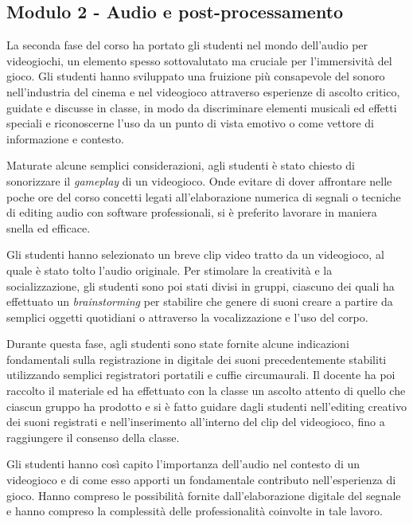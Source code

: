 \documentclass{easychair}
\begin{document}
\subsection{Modulo 2 - Audio e post-processamento}

La seconda fase del corso ha portato gli studenti nel mondo dell'audio per videogiochi, un elemento spesso sottovalutato ma cruciale per l'immersività del gioco. Gli studenti hanno sviluppato una fruizione più consapevole del sonoro nell'industria del cinema e nel videogioco attraverso esperienze di ascolto critico, guidate e discusse in classe, in modo da discriminare elementi musicali ed effetti speciali e riconoscerne l'uso da un punto di vista emotivo o come vettore di informazione e contesto.

Maturate alcune semplici considerazioni, agli studenti è stato chiesto di sonorizzare il \textit{gameplay} di un videogioco. Onde evitare di dover affrontare nelle poche ore del corso concetti legati all'elaborazione numerica di segnali o tecniche di editing audio con software professionali, si è preferito lavorare in maniera snella ed efficace. 

Gli studenti hanno selezionato un breve clip video tratto da un videogioco, al quale è stato tolto l'audio originale. Per stimolare la creatività e la socializzazione, gli studenti sono poi stati divisi in gruppi, ciascuno dei quali ha effettuato un \textit{brainstorming} per stabilire che genere di suoni creare a partire da semplici oggetti quotidiani o attraverso la vocalizzazione e l'uso del corpo.

Durante questa fase, agli studenti sono state fornite alcune indicazioni fondamentali sulla registrazione in digitale dei suoni precedentemente stabiliti utilizzando semplici registratori portatili e cuffie circumaurali. Il docente ha poi raccolto il materiale ed ha effettuato con la classe un ascolto attento di quello che ciascun gruppo ha prodotto e si è fatto guidare dagli studenti nell'editing creativo dei suoni registrati e nell'inserimento all'interno del clip del videogioco, fino a raggiungere il consenso della classe.

Gli studenti hanno così capito l'importanza dell'audio nel contesto di un videogioco e di come esso apporti un fondamentale contributo nell'esperienza di gioco. Hanno compreso le possibilità fornite dall'elaborazione digitale del segnale e hanno compreso la complessità delle professionalità coinvolte in tale lavoro.  %
\end{document}
